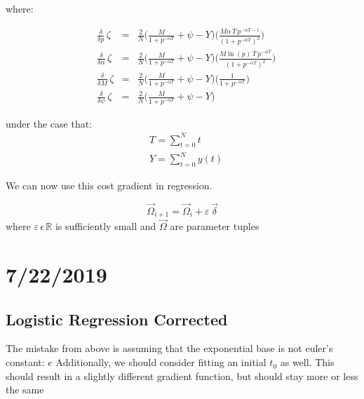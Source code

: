\documentclass{article}
\begin{document}
\noindent
where:

\begin{align}
 &\frac{\delta}{\delta p}\,\zeta   &=        &\frac{2}{N}\Big( \frac{M}{1+p^{-\alpha T}} + \psi - Y \Big)         \Big( \frac{M\alpha \, T\, p^{-\alpha T-1}}{(1+p^{-\alpha T})^2} \Big) \\[1em]
 &\frac{\delta}{\delta \alpha}\,\zeta  &=   &\frac{2}{N}\Big( \frac{M}{1+p^{-\alpha T}} + \psi - Y \Big)         \Big( \frac{M \ln(p)\, T\, p^{-\alpha T}}{(1+p^{-\alpha T})^2} \Big) \\[1em]
 &\frac{\delta}{\delta M}\,\zeta   &=        &\frac{2}{N}\Big( \frac{M}{1+p^{-\alpha T}} + \psi - Y \Big)         \Big( \frac{1}{1+p^{-\alpha T}} \Big) \\[1em]
 &\frac{\delta}{\delta \psi}\,\zeta    &=     &\frac{2}{N}\Big( \frac{M}{1+p^{-\alpha T}} + \psi - Y \Big)
\end{align}

\noindent
under the case that:
\begin{align*}
    &T = \sum_{t=0}^{N} t \\[1em]
    &Y = \sum_{t=0}^{N} y(t)
\end{align*}

\noindent
We can now use this cost gradient in regression.

 $$\vec{\Omega}_{i+1} = \vec{\Omega}_i + \varepsilon \,\vec{\delta}$$
 {\centering where $\varepsilon \, \epsilon \, \mathbb{R}$ is sufficiently small and $\vec{\Omega}$ are parameter tuples
 }




\section*{7/22/2019}
\subsection*{Logistic Regression Corrected}
The mistake from above is assuming that the exponential base is not euler's constant: $e$
Additionally, we should consider fitting an initial $t_0$ as well. This should result in a slightly different gradient function, but should stay more or less the same
\end{document}
